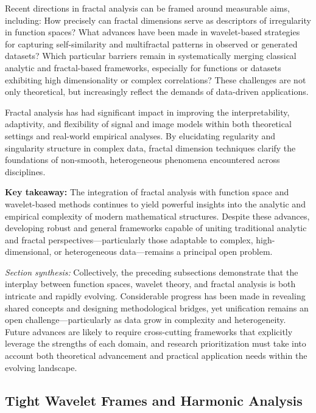 \documentclass[sigconf]{acmart}
\begin{document}
Recent directions in fractal analysis can be framed around measurable aims, including: How precisely can fractal dimensions serve as descriptors of irregularity in function spaces? What advances have been made in wavelet-based strategies for capturing self-similarity and multifractal patterns in observed or generated datasets? Which particular barriers remain in systematically merging classical analytic and fractal-based frameworks, especially for functions or datasets exhibiting high dimensionality or complex correlations? These challenges are not only theoretical, but increasingly reflect the demands of data-driven applications.

Fractal analysis has had significant impact in improving the interpretability, adaptivity, and flexibility of signal and image models within both theoretical settings and real-world empirical analyses. By elucidating regularity and singularity structure in complex data, fractal dimension techniques clarify the foundations of non-smooth, heterogeneous phenomena encountered across disciplines.

\textbf{Key takeaway:} The integration of fractal analysis with function space and wavelet-based methods continues to yield powerful insights into the analytic and empirical complexity of modern mathematical structures. Despite these advances, developing robust and general frameworks capable of uniting traditional analytic and fractal perspectives—particularly those adaptable to complex, high-dimensional, or heterogeneous data—remains a principal open problem.

\vspace{1em}

\noindent
\textit{Section synthesis:} Collectively, the preceding subsections demonstrate that the interplay between function spaces, wavelet theory, and fractal analysis is both intricate and rapidly evolving. Considerable progress has been made in revealing shared concepts and designing methodological bridges, yet unification remains an open challenge—particularly as data grow in complexity and heterogeneity. Future advances are likely to require cross-cutting frameworks that explicitly leverage the strengths of each domain, and research prioritization must take into account both theoretical advancement and practical application needs within the evolving landscape. 


\subsection{Tight Wavelet Frames and Harmonic Analysis}
\end{document}
